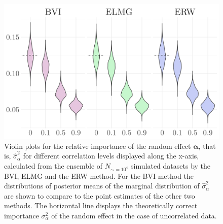 \begin{figure}[ht]
  \centering
  \includegraphics[width=0.7\linewidth]{Figures/ViolinPlots/Variance_gamma.png}
  \caption[Relative importance of the random effect $\boldsymbol{\alpha}$ in Gaussian LMM]{Violin plots for the relative importance of the random effect $\boldsymbol{\alpha}$, that is, $\hat{\sigma}^2_{\alpha}$ for different correlation levels displayed along the x-axis, calculated from the ensemble of $N_{\sim=10^4}$ simulated datasets by the BVI, ELMG and the ERW method. For the BVI method the distributions of posterior means of the marginal distribution of $\hat{\sigma}^2_{\alpha}$ are shown to compare to the point estimates of the other two methods. The horizontal line displays the theoretically correct importance $\sigma^2_{\alpha}$ of the random effect in the case of uncorrelated data.}
  \label{fig:relimp_alpha}
\end{figure}

